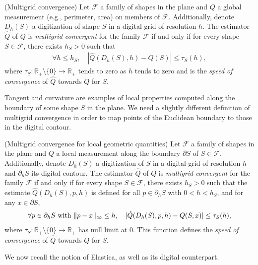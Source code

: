 \documentclass[runningheads]{llncs}
\DeclarePairedDelimiter\norm{\lVert}{\rVert}%
\begin{document}
\begin{definition}{(Multigrid convergence)}
  Let $\mathcal{F}$ a family of shapes in the plane and $Q$ a global measurement (e.g., perimeter, area) on members of
  $\mathcal{F}$. Additionally, denote $D_h(S)$ a digitization of shape $S$ in a digital grid of resolution $h$. The
  estimator $\hat{Q}$ of $Q$ is {\em multigrid convergent} for the family $\mathcal{F}$ if and only if for every shape
  $S \in \mathcal{F}$, there exists $h_S > 0$ such that
\begin{align*}
\forall h \leq h_S, \quad |\hat{Q}(D_h(S),h) - Q(S)| \leq \tau_S(h),
\end{align*}
%
where $\tau_S:\mathbb{R}_+\setminus \{0\} \rightarrow \mathbb{R}_+$ tends to zero as $h$ tends to zero and is the {\em speed of convergence} of $\hat{Q}$ towards $Q$
for $S$.
\end{definition}

Tangent and curvature are examples of local properties computed along the boundary of some shape $S$ in the plane. We
need a slightly different definition of multigrid convergence in order to map points of the Euclidean boundary to those in
the digital contour.

\begin{definition}{(Multigrid convergence for local geometric quantities)}
  Let $\mathcal{F}$ a family of shapes in the plane and $Q$ a local measurement along the boundary $\partial S$ of
  $S \in \mathcal{F}$. Additionally, denote $D_h(S)$ a digitization of $S$ in a digital grid of resolution $h$ and
  $\partial_h S$ its digital contour. The estimator $\hat{Q}$ of $Q$ is {\em multigrid convergent} for the family
  $\mathcal{F}$ if and only if for every shape $S \in \mathcal{F}$, there exists $h_S > 0$ such that the estimate
  $\hat{Q}(D_h(S),p,h)$ is defined for all $p \in \partial_h S$ with $0 < h < h_S$, and for any $x \in \partial S$,
\begin{align*}
	\forall p \in \partial_h S \text{ with } \norm{p-x}_{\infty} \leq h,\quad | \hat{Q}(D_h(S),p,h) - Q(S,x) | \leq \tau_S(h),	
\end{align*}
where $\tau_S:\mathbb{R}_+\setminus \{0\} \rightarrow \mathbb{R}_+$ has null limit at $0$. This function defines the
{\em speed of convergence} of $\hat{Q}$ towards $Q$ for $S$.
\end{definition}

We now recall the notion of Elastica, as well as its digital counterpart.
\end{document}
